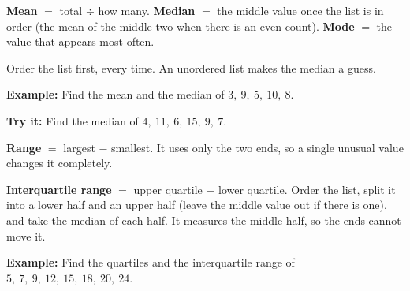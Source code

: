 \documentclass[12pt]{article}
\begin{document}


\begin{formulabox}
\textbf{Mean} $=$ total $\div$ how many. \quad \textbf{Median} $=$ the middle
value once the list is in order (the mean of the middle two when there is an
even count). \quad \textbf{Mode} $=$ the value that appears most often.\par
Order the list first, every time. An unordered list makes the median a guess.
\end{formulabox}

\begin{examplebox}
\textbf{Example:} \quad Find the mean and the median of $3,\ 9,\ 5,\ 10,\ 8$.
\end{examplebox}

\begin{tryitbox}
\textbf{Try it:} \quad Find the median of $4,\ 11,\ 6,\ 15,\ 9,\ 7$.\\[2pt]
\end{tryitbox}


\begin{formulabox}
\textbf{Range} $=$ largest $-$ smallest. It uses only the two ends, so a single
unusual value changes it completely.\par
\textbf{Interquartile range} $=$ upper quartile $-$ lower quartile. Order the
list, split it into a lower half and an upper half (leave the middle value out
if there is one), and take the median of each half. It measures the middle half,
so the ends cannot move it.
\end{formulabox}

\begin{examplebox}
\textbf{Example:} \quad Find the quartiles and the interquartile range of
$5,\ 7,\ 9,\ 12,\ 15,\ 18,\ 20,\ 24$.
\end{examplebox}
\end{document}

